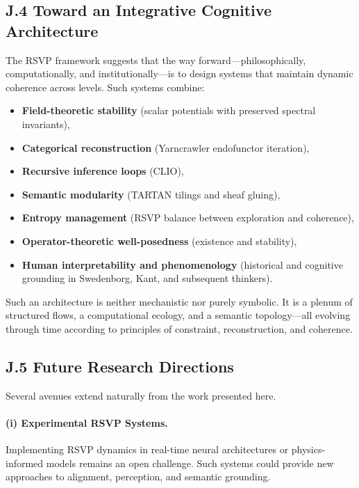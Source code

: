 \documentclass[12pt]{article}
\begin{document}
\subsection*{J.4 Toward an Integrative Cognitive Architecture}

The RSVP framework suggests that the way forward—philosophically, 
computationally, and institutionally—is to design systems that maintain 
dynamic coherence across levels.  
Such systems combine:

\begin{itemize}
    \item \textbf{Field-theoretic stability} (scalar potentials with preserved 
    spectral invariants),
    \item \textbf{Categorical reconstruction} (Yarncrawler endofunctor 
    iteration),
    \item \textbf{Recursive inference loops} (CLIO),
    \item \textbf{Semantic modularity} (TARTAN tilings and sheaf gluing),
    \item \textbf{Entropy management} (RSVP balance between exploration and 
    coherence),
    \item \textbf{Operator-theoretic well-posedness} (existence and stability),
    \item \textbf{Human interpretability and phenomenology} (historical and 
    cognitive grounding in Swedenborg, Kant, and subsequent thinkers).
\end{itemize}

Such an architecture is neither mechanistic nor purely symbolic.  
It is a plenum of structured flows, a computational ecology, and a semantic 
topology—all evolving through time according to principles of constraint, 
reconstruction, and coherence.

\subsection*{J.5 Future Research Directions}

Several avenues extend naturally from the work presented here.

\paragraph{(i) Experimental RSVP Systems.}  
Implementing RSVP dynamics in real-time neural architectures or 
physics-informed models remains an open challenge.  
Such systems could provide new approaches to alignment, perception, and 
semantic grounding.
\end{document}
